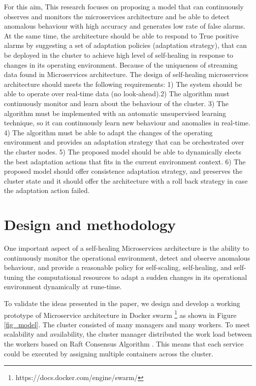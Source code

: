 \documentclass[sigconf]{acmart}
\begin{document}
For this aim, This research focuses on proposing a model that can continuously observes and monitors the microservices architecture and be able to detect anomalous behaviour with high accuracy and generates low rate of false alarms. At the same time, the architecture should be able to respond to True positive alarms by suggesting a set of adaptation policies (adaptation strategy), that can be deployed in the cluster to achieve high level of self-healing in response to changes in its operating environment. Because of the uniqueness of streaming data found in Microservices architecture. The design of self-healing microservices architecture should meets the following requirements: 1) The system should be able to operate over real-time data (no look-ahead).2) The algorithm must continuously monitor and learn about the behaviour of the cluster. 3) The algorithm must be implemented with an automatic unsupervised learning technique, so it can continuously learn new behaviour and anomalies in real-time. 4) The algorithm must be able to adapt the changes of the operating environment and provides an adaptation strategy that can be orchestrated over the cluster nodes. 5) The proposed model should be able to dynamically elects the best adaptation actions that fits in the current environment context. 6) The proposed model should offer consistence adaptation strategy, and preserves the cluster state and it should offer the architecture with a roll back strategy in case the adaptation action failed. 
 
\section{Design and methodology}
\label{sec:modelling}
One important aspect of a self-healing Microservices architecture is the ability to continuously monitor the operational environment, detect and observe anomalous behaviour, and provide a reasonable policy for self-scaling, self-healing, and self-tuning the computational resources to adapt a sudden changes in its operational environment dynamically at rune-time.  

To validate the ideas presented in the paper, we design and develop a working prototype of Microservice architecture in Docker swarm \footnote{https://docs.docker.com/engine/swarm/} as shown in Figure \ref{fig_model}. The cluster consisted of many managers and many workers. To meet scalability and availability, the cluster manager distributed the work load between the workers based on Raft Consensus Algorithm \cite{ongaro2015raft}. This means that each service could be executed by assigning multiple containers across the cluster. 
\end{document}
